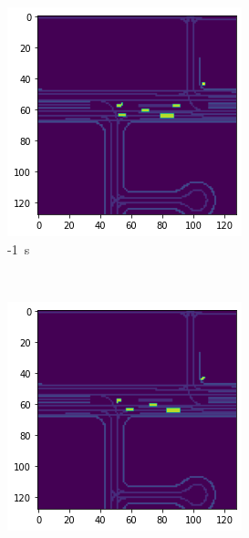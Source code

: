 \documentclass[12pt]{article}
\begin{document}
    \begin{figure}[H]
        \centering
        \begin{subfigure}[b]{0.18\textwidth}
            \includegraphics[width=\textwidth]{output_low_dens_0.png}
            \caption{-1~s}
        \end{subfigure}
        ~
        \begin{subfigure}[b]{0.18\textwidth}
            \includegraphics[width=\textwidth]{output_low_dens_1.png}

\end{subfigure}
\end{figure}
\end{document}
